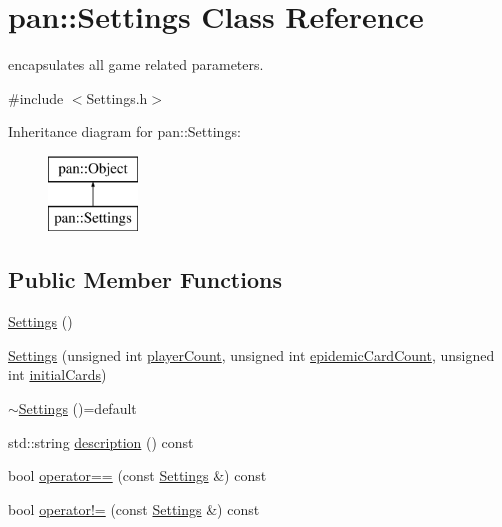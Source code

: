 \hypertarget{classpan_1_1_settings}{}\section{pan\+:\+:Settings Class Reference}
\label{classpan_1_1_settings}


encapsulates all game related parameters.  




{\ttfamily \#include $<$Settings.\+h$>$}

Inheritance diagram for pan\+:\+:Settings\+:\begin{figure}[H]
\begin{center}
\leavevmode
\includegraphics[height=2.000000cm]{classpan_1_1_settings}
\end{center}
\end{figure}
\subsection*{Public Member Functions}
\begin{DoxyCompactItemize}
\item 
\hyperlink{classpan_1_1_settings_af5bdfa4c3ed9460b0290d9f3d0aee02a}{Settings} ()
\item 
\hyperlink{classpan_1_1_settings_a88e5d34527d110fd6391df762199c405}{Settings} (unsigned int \hyperlink{classpan_1_1_settings_a4a7c2963d63bd768b9e64ffb8461333f}{player\+Count}, unsigned int \hyperlink{classpan_1_1_settings_a61569c8a2fcccdf9409d5467625ee788}{epidemic\+Card\+Count}, unsigned int \hyperlink{classpan_1_1_settings_adf8144ec33fa2217b8fc422e7b4806be}{initial\+Cards})
\item 
\hyperlink{classpan_1_1_settings_a73b85e961b1be7a48d5cca58c9a61f41}{$\sim$\+Settings} ()=default
\item 
std\+::string \hyperlink{classpan_1_1_settings_ac88db54a696993babc9c495d54fc89c3}{description} () const
\item 
bool \hyperlink{classpan_1_1_settings_a5a068817d5e6f48ac72b9f2706f185a8}{operator==} (const \hyperlink{classpan_1_1_settings}{Settings} \&) const
\item 
bool \hyperlink{classpan_1_1_settings_a47b2bc896ccc1de8ab00f734555b4cdc}{operator!=} (const \hyperlink{classpan_1_1_settings}{Settings} \&) const
\end{DoxyCompactItemize}
